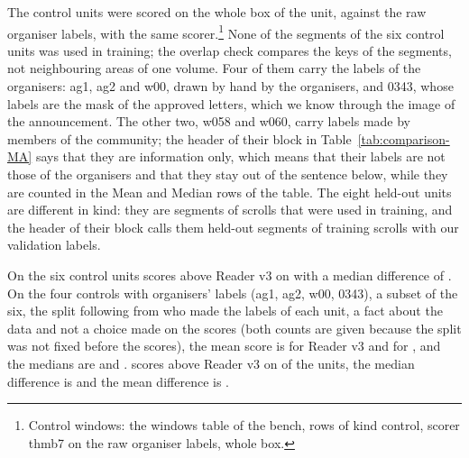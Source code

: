 The control units were scored on the whole box of the unit, against the raw organiser labels, with the same
scorer.\footnote{Control windows: the windows table of the bench, rows of kind control, scorer
thmb7 on the raw organiser labels, whole box.} None of the segments of the six control units was used in training; the overlap check compares the keys of the segments, not neighbouring areas of one volume. Four of them carry the
labels of the organisers: ag1, ag2 and w00, drawn by hand by the organisers, and 0343, whose labels are the mask of the
approved letters, which we know through the image of the announcement. The other two, w058 and w060, carry
labels made by members of the community; the header of their block in Table~\ref{tab:comparison-MA} says that they are
information only, which means that their labels are not those of the organisers and that they stay out of the
sentence below, while they are counted in the Mean and Median rows of the table. The eight held-out units are
different in kind: they are segments of scrolls that were used in training, and the header of their block calls them
held-out segments of training scrolls with our validation labels.

On the six control units \MAModelName{} scores above Reader v3 on \MAStatsCtrlKText{} with a median difference of \MAStatsCtrlMedianDiff{}. On the four controls with organisers' labels (ag1, ag2, w00, 0343), a subset of the six, the split following from who made the labels of each unit, a fact about the data and not a choice made on the scores (both counts are given because the split was not fixed before the scores), the mean score is \MACtrlMeanReader{} for Reader v3 and \MACtrlMeanModel{} for
\MAModelName{}, and the medians are \MACtrlMedianReader{} and \MACtrlMedianModel{}. \MAModelName{} scores above Reader v3 on
\MACtrlAbove{} of the \MACtrlN{} units, the median difference is \MACtrlMedianDiff{} and the mean difference is
\MACtrlMeanDiff{}\MALowCtrl.


